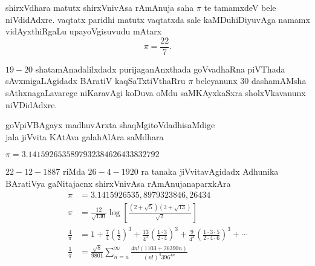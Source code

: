 shirxVdhara matutx shirxVnivAsa rAmAnuja saha $\pi$ te tamamxdeV bele niVdidAdxre. vaqtatx paridhi matutx vaqtatxda sale kaMDuhiDiyuvAga namamx vidAyxthiRgaLu upayoVgisuvudu mAtarx
$$
\pi = \frac{22}{7}.
$$

$19-20$ shatamAnadalilxdadx purijaganAnxthada goVvadhaRna piVThada sAvxmigaLAgidadx BAratiV kaqSaTxtiVthaRru $\pi$ beleyanunx $30$ dashamAMsha sAthxnagaLavarege niKaravAgi koDuva oMdu saMKAyxkaSxra sholxVkavanunx niVDidAdxre. 
\begin{center}
goVpiVBAgayx madhuvArxta shaqMgitoVdadhisaMdige\\
jala jiVvita KAtAva galahAlAra saMdhara
\end{center}

$\pi = 3.1415926535897932384626433832792$

$22-12-1887$ riMda $26-4-1920$ ra tanaka jiVvitavAgidadx Adhunika BAratiVya gaNitajacnx shirxVnivAsa rAmAnujanaparxkAra
\begin{align*}
\pi &= 3.1415926535,8979323846,26434\\
\pi &= \frac{12}{\sqrt{130}}\log\left[\frac{{(2+\sqrt{5})}{(3+\sqrt{13})}}{\sqrt{2}}\right]\\
\frac{4}{\pi} &= 1 + \frac{7}{4}\left(\frac{1}{2}\right)^3 + \frac{13}{4^{2}}\left(\frac{1 \cdot 3}{2 \cdot 4}\right)^3 + \frac{9}{4^{3}}\left(\frac{1 \cdot 3 \cdot 5}{2 \cdot 4 \cdot 6}\right)^3 +\cdots\\
\frac{1}{\pi} &= \frac{\sqrt{8}}{9801} \sum_{n=a}^\infty \frac{4n!(1103+26390n)}{(n!)^{4}396^{4n}}
\end{align*}

